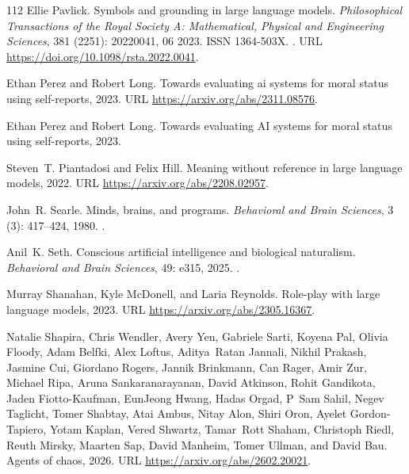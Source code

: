 \begin{thebibliography}{112}
Ellie Pavlick.
\newblock Symbols and grounding in large language models.
\newblock \emph{Philosophical Transactions of the Royal Society A: Mathematical, Physical and Engineering Sciences}, 381 (2251): 20220041, 06 2023.
\newblock ISSN 1364-503X.
\newblock {}.
\newblock URL \url{https://doi.org/10.1098/rsta.2022.0041}.

Ethan Perez and Robert Long.
\newblock Towards evaluating ai systems for moral status using self-reports, 2023{}.
\newblock URL \url{https://arxiv.org/abs/2311.08576}.

Ethan Perez and Robert Long.
\newblock Towards evaluating {AI} systems for moral status using self-reports, 2023{}.

Steven~T. Piantadosi and Felix Hill.
\newblock Meaning without reference in large language models, 2022.
\newblock URL \url{https://arxiv.org/abs/2208.02957}.

John~R. Searle.
\newblock Minds, brains, and programs.
\newblock \emph{Behavioral and Brain Sciences}, 3 (3): 417--424, 1980.
\newblock {}.

Anil~K. Seth.
\newblock Conscious artificial intelligence and biological naturalism.
\newblock \emph{Behavioral and Brain Sciences}, 49: e315, 2025.
\newblock {}.

Murray Shanahan, Kyle McDonell, and Laria Reynolds.
\newblock Role-play with large language models, 2023.
\newblock URL \url{https://arxiv.org/abs/2305.16367}.

Natalie Shapira, Chris Wendler, Avery Yen, Gabriele Sarti, Koyena Pal, Olivia Floody, Adam Belfki, Alex Loftus, Aditya~Ratan Jannali, Nikhil Prakash, Jasmine Cui, Giordano Rogers, Jannik Brinkmann, Can Rager, Amir Zur, Michael Ripa, Aruna Sankaranarayanan, David Atkinson, Rohit Gandikota, Jaden Fiotto-Kaufman, EunJeong Hwang, Hadas Orgad, P~Sam Sahil, Negev Taglicht, Tomer Shabtay, Atai Ambus, Nitay Alon, Shiri Oron, Ayelet Gordon-Tapiero, Yotam Kaplan, Vered Shwartz, Tamar~Rott Shaham, Christoph Riedl, Reuth Mirsky, Maarten Sap, David Manheim, Tomer Ullman, and David Bau.
\newblock Agents of chaos, 2026.
\newblock URL \url{https://arxiv.org/abs/2602.20021}.


\end{thebibliography}
